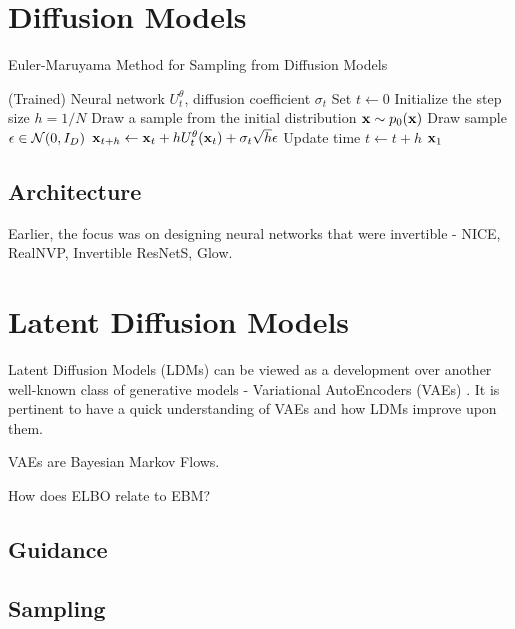\documentclass[a4paper, 11pt]{article}
\begin{document}
\section{Diffusion Models}

\begin{algorithm}
    \caption{Euler-Maruyama Method for Sampling from Diffusion Models}\label{alg:diff_sample}
    \begin{algorithmic}[1]
    \Require (Trained) Neural network $U_t^{\theta}$, diffusion coefficient $\sigma_t$
    \State Set $t \gets 0$
    \State Initialize the step size $h = 1 / N$
    \State Draw a sample from the initial distribution $\mbox{$\mbox{$\mathbf{x}$}$} \sim p_0(\mbox{$\mbox{$\mathbf{x}$}$})$
    \State Draw sample $\epsilon \in \mbox{$\cal N$}(0, I_D)$
    \State $\mbox{$\mbox{$\mathbf{x}$}$}_{t+h} \gets \mbox{$\mbox{$\mathbf{x}$}$}_t + h U_t^{\theta}(\mbox{$\mbox{$\mathbf{x}$}$}_t) + \sigma_t \sqrt{h}\epsilon$
    \State Update time $t \gets t + h$
    \EndFor
    \State \Return $\mbox{$\mbox{$\mathbf{x}$}$}_1$
    \end{algorithmic}
\end{algorithm}


\subsection{Architecture}
Earlier, the focus was on designing neural networks that were invertible - NICE, RealNVP, Invertible ResNetS, Glow.

\section{Latent Diffusion Models}

Latent Diffusion Models (LDMs) can be viewed as a development over another well-known class of generative models - Variational AutoEncoders (VAEs) \cite{dieleman2023perspectives}. It is pertinent to have a quick understanding of VAEs and how LDMs improve upon them.

VAEs are Bayesian Markov Flows.

How does ELBO relate to EBM? 



\subsection{Guidance}

\subsection{Sampling}
\end{document}

